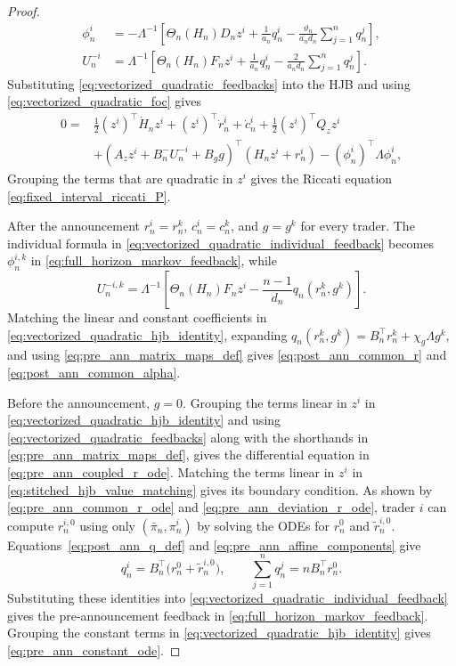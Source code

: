 \documentclass[12pt]{article}
\numberwithin{equation}{section}
\theoremstyle{definition}
\begin{document}
\begin{proof}
\begin{subequations}\label{eq:vectorized_quadratic_feedbacks}
\begin{align}
\phi_n^i
&=-\Lambda^{-1}\left[
\Theta_n(H_n)D_nz^i+\frac1{a_n}q_n^i
-\frac{\vartheta_n}{a_nd_n}\sum_{j=1}^nq_n^j
\right],
\label{eq:vectorized_quadratic_individual_feedback}
\\
U_n^{-i}
&=\Lambda^{-1}\left[
\Theta_n(H_n)F_nz^i+\frac1{a_n}q_n^i
-\frac2{a_nd_n}\sum_{j=1}^nq_n^j
\right].
\label{eq:vectorized_quadratic_opponent_feedback}
\end{align}
\end{subequations}
Substituting \eqref{eq:vectorized_quadratic_feedbacks} into the HJB and using
\eqref{eq:vectorized_quadratic_foc} gives
\begin{equation}\label{eq:vectorized_quadratic_hjb_identity}
\begin{aligned}
0={}&\frac12(z^i)^\top\dot H_nz^i+(z^i)^\top\dot r_n^i+\dot c_n^i
+\frac12(z^i)^\top Q_zz^i
\\
&+\left(A_zz^i+B_n^{-}U_n^{-i}+B_gg\right)^\top(H_nz^i+r_n^i)
-(\phi_n^i)^\top\Lambda\phi_n^i,
\end{aligned}
\end{equation}
Grouping the terms that are quadratic in \(z^i\) gives the Riccati equation
\eqref{eq:fixed_interval_riccati_P}.

After the announcement \(r_n^i=r_n^k\), \(c_n^i=c_n^k\), and \(g=g^k\)
for every trader. The individual formula in
\eqref{eq:vectorized_quadratic_individual_feedback} becomes \(\phi_n^{i,k}\) in
\eqref{eq:full_horizon_markov_feedback}, while
\[
U_n^{-i,k}
=\Lambda^{-1}\left[
\Theta_n(H_n)F_nz^i-\frac{n-1}{d_n}q_n(r_n^k,g^k)\right].
\]
Matching the linear and constant coefficients in
\eqref{eq:vectorized_quadratic_hjb_identity}, expanding
\(q_n(r_n^k,g^k)=B_n^\top r_n^k+\chi_g\Lambda g^k\), and using
\eqref{eq:pre_ann_matrix_maps_def} gives
\eqref{eq:post_ann_common_r} and \eqref{eq:post_ann_common_alpha}.

Before the announcement, \(g=0\). Grouping the terms linear in \(z^i\) in
\eqref{eq:vectorized_quadratic_hjb_identity} and using
\eqref{eq:vectorized_quadratic_feedbacks} along with the shorthands in
\eqref{eq:pre_ann_matrix_maps_def}, gives the differential equation in
\eqref{eq:pre_ann_coupled_r_ode}. Matching the terms linear in \(z^i\) in
\eqref{eq:stitched_hjb_value_matching} gives its boundary condition. As shown by
\eqref{eq:pre_ann_common_r_ode} and
\eqref{eq:pre_ann_deviation_r_ode}, trader \(i\) can compute \(r_n^{i,0}\)
using only \((\bar\pi_n,\pi_n^i)\) by solving the ODEs for \(r_n^0\)
and \(\widetilde r_n^{i,0}\).
Equations~\eqref{eq:post_ann_q_def} and
\eqref{eq:pre_ann_affine_components} give
\[
q_n^i=B_n^\top\bigl(r_n^0+\widetilde r_n^{i,0}\bigr),
\qquad
\sum_{j=1}^nq_n^j=nB_n^\top r_n^0.
\]
Substituting these identities into
\eqref{eq:vectorized_quadratic_individual_feedback} gives the
pre-announcement feedback in
\eqref{eq:full_horizon_markov_feedback}. Grouping the constant terms in
\eqref{eq:vectorized_quadratic_hjb_identity} gives
\eqref{eq:pre_ann_constant_ode}.


\end{proof}
\end{document}
